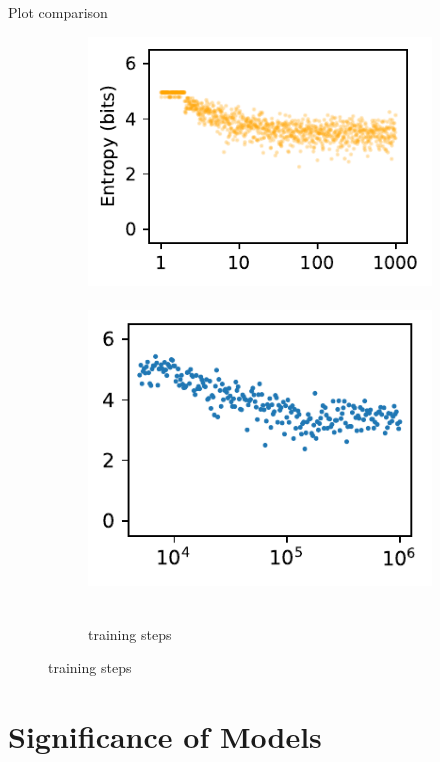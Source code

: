 \documentclass{beamer}
\begin{document}
\begin{frame}{Plot comparison}
\begin{center}
\begin{figure}
\begin{subfigure}[t]{\subfigwidth\linewidth}
                \includegraphics[height=\plotheight]{assets/model-n_iters.pdf}
                \hbox{
                    \hspace{-0.15em}
                    \includegraphics[height=\plotheight]{assets/total_timesteps_log-entropy-default.pdf}
                }
                \caption{\scriptsize training steps}
            \end{subfigure}

        \end{figure}
    \end{center}
\end{frame}


\section{Significance of Models}
\end{document}
